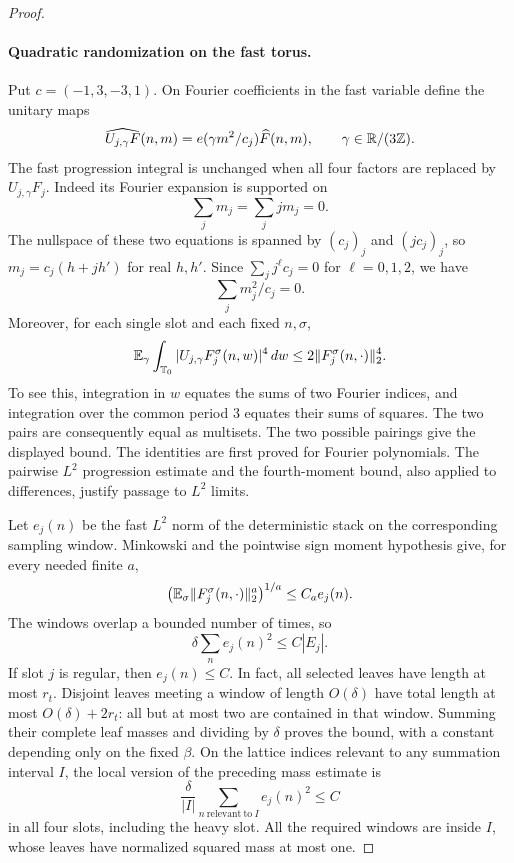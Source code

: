 \begin{proof}
\paragraph{Quadratic randomization on the fast torus.}
Put $c=(-1,3,-3,1)$.  On Fourier coefficients in the fast variable
define the unitary maps
\[
 \widehat{U_{j,\gamma}F}(n,m)
   =e(\gamma m^2/c_j)\widehat F(n,m),
 \qquad \gamma\in\mathbb R/(3\mathbb Z).
\]
The fast progression integral is unchanged when all four factors are
replaced by $U_{j,\gamma}F_j$.  Indeed its Fourier expansion is
supported on
\[
 \sum_jm_j=\sum_jjm_j=0.
\]
The nullspace of these two equations is spanned by $(c_j)_j$ and
$(jc_j)_j$, so $m_j=c_j(h+jh')$ for real $h,h'$.  Since
$\sum_j j^\ell c_j=0$ for $\ell=0,1,2$, we have
\[
 \sum_jm_j^2/c_j=0.
\]
Moreover, for each single slot and each fixed $n,\sigma$,
\[
 \mathbb E_\gamma\int_{\mathbb T_0}|U_{j,\gamma}F_j^\sigma(n,w)|^4\,dw
 \le 2\|F_j^\sigma(n,\cdot)\|_2^4.
\]
To see this, integration in $w$ equates the sums of two Fourier
indices, and integration over the common period $3$ equates their
sums of squares.  The two pairs are consequently equal as multisets.
The two possible pairings give the displayed bound.  The identities
are first proved for Fourier polynomials.  The pairwise $L^2$
progression estimate and the fourth-moment bound, also applied to
differences, justify passage to $L^2$ limits.

Let $e_j(n)$ be the fast $L^2$ norm of the deterministic stack on the
corresponding sampling window.  Minkowski and the pointwise sign
moment hypothesis give, for every needed finite $a$,
\[
 \bigl(\mathbb E_\sigma\|F_j^\sigma(n,\cdot)\|_2^a\bigr)^{1/a}
 \le C_a e_j(n).
\]
The windows overlap a bounded number of times, so
\[
 \delta\sum_n e_j(n)^2\le C|E_j|.
\]
If slot $j$ is regular, then $e_j(n)\le C$.  In fact, all selected
leaves have length at most $r_t$.  Disjoint leaves meeting a window of
length $O(\delta)$ have total length at most $O(\delta)+2r_t$: all but
at most two are contained in that window.  Summing their complete
leaf masses and dividing by $\delta$ proves the bound, with a constant
depending only on the fixed $\beta$.  On the lattice indices relevant
to any summation interval $I$, the local version of the preceding mass
estimate is
\[
 \frac{\delta}{|I|}\sum_{n\ \mathrm{relevant\ to}\ I}e_j(n)^2
 \le C
\]
in all four slots, including the heavy slot.  All the required windows
are inside $I$, whose leaves have normalized squared mass at most one.


\end{proof}
